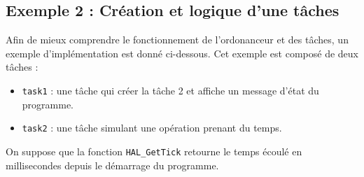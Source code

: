 \subsection{Exemple 2 : Création et logique d'une tâches}
\label{subsec:exemple_2}

Afin de mieux comprendre le fonctionnement de l'ordonanceur et des tâches, un exemple
d'implémentation est donné ci-dessous. Cet exemple est composé de deux tâches :
\begin{itemize}
    \item \texttt{task1} : une tâche qui créer la tâche 2 et affiche un message
    d'état du programme.
    \item \texttt{task2} : une tâche simulant une opération prenant du temps.
\end{itemize}
On suppose que la fonction \texttt{HAL\_GetTick} retourne le temps écoulé en millisecondes
depuis le démarrage du programme.

